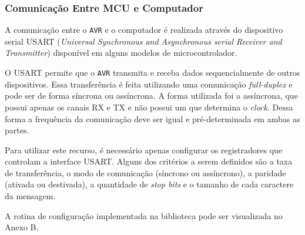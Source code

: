 \subsubsection{Comunicação Entre MCU e Computador}
A comunicação entre o \texttt{AVR} e o computador é realizada através do dispositivo serial USART
(\textit{Universal Synchronous and Asynchronous serial Receiver and Transmitter}) disponível em alguns modelos
de microcontrolador.

O USART permite que o \texttt{AVR} transmita e receba dados sequencialmente de outros dispositivos. Essa
transferência é feita utilizando uma comunicação \textit{full-duplex} e pode ser de forma síncrona ou
assíncrona. A forma utilizada foi a assíncrona, que possui apenas os canais RX e TX e não possui um que
determina o \textit{clock}. Dessa forma a frequência da comunicação deve ser igual e pré-determinada em ambas
as partes.

Para utilizar este recurso, é necessário apenas configurar os registradores que controlam a interface USART.
Alguns dos critérios a serem definidos são a taxa de transferência, o modo de comunicação (síncrono ou
assíncrono), a paridade (ativada ou destivada), a quantidade de \textit{stop bits} e o tamanho de cada
caractere da mensagem.

A rotina de configuração implementada na biblioteca pode ser visualizada no Anexo B.
